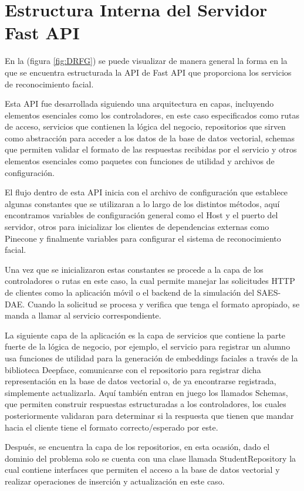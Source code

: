 \section{Estructura Interna del Servidor Fast API}

En la (figura \ref{fig:DRFG}) se puede visualizar de manera general la forma en la que se encuentra estructurada la API de Fast API que proporciona los servicios de reconocimiento facial.


Esta API fue desarrollada siguiendo una arquitectura en capas, incluyendo elementos esenciales como los controladores, en este caso especificados como rutas de acceso, servicios que contienen la lógica del negocio, repositorios que sirven como abstracción para acceder a los datos de la base de datos vectorial, schemas que permiten validar el formato de las respuestas recibidas por el servicio y otros elementos esenciales como paquetes con funciones de utilidad y archivos de configuración.


El flujo dentro de esta API inicia con el archivo de configuración que establece algunas constantes que se utilizaran a lo largo de los distintos métodos, aquí encontramos variables de configuración general como el Host y el puerto del servidor, otros para inicializar los clientes de dependencias externas como Pinecone y finalmente variables para configurar el sistema de reconocimiento facial.

Una vez que se inicializaron estas constantes se procede a la capa de los controladores o rutas en este caso, la cual permite manejar las solicitudes HTTP de clientes como la aplicación móvil o el backend de la simulación del SAES-DAE.
Cuando la solicitud se procesa y verifica que tenga el formato apropiado, se manda a llamar al servicio correspondiente.

La siguiente capa de la aplicación es la capa de servicios que contiene la parte fuerte de la lógica de negocio, por ejemplo, el servicio para registrar un alumno usa funciones de utilidad para la generación de embeddings faciales a través de la biblioteca Deepface, comunicarse con el repositorio para registrar dicha representación en la base de datos vectorial o, de ya encontrarse registrada, simplemente actualizarla. Aquí también entran en juego los llamados Schemas, que permiten construir respuestas estructuradas a los controladores, los cuales posteriormente validaran para determinar si la respuesta que tienen que mandar hacia el cliente tiene el formato correcto/esperado por este.

Después, se encuentra la capa de los repositorios, en esta ocasión, dado el dominio del problema solo se cuenta con una clase llamada StudentRepository la cual contiene interfaces que permiten el acceso a la base de datos vectorial y realizar operaciones de inserción y actualización en este caso.

